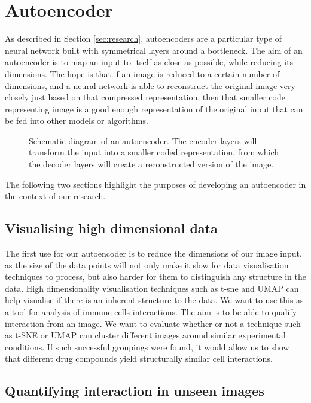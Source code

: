 \section{Autoencoder}

As described in Section \ref{sec:research}, autoencoders are a particular type of neural network built with symmetrical layers around a bottleneck. The aim of an autoencoder is to map an input to itself as close as possible, while reducing its dimensions. The hope is that if an image is reduced to a certain number of dimensions, and a neural network is able to reconstruct the original image very closely just based on that compressed representation, then that smaller code representing image is a good enough representation of the original input that can be fed into other models or algorithms.

\begin{figure}[h]
    \centering
    \caption{Schematic diagram of an autoencoder. The encoder layers will transform the input into a smaller coded representation, from which the decoder layers will create a reconstructed version of the image.}
    \label{fig:autoencoder}
\end{figure}

The following two sections highlight the purposes of developing an autoencoder in the context of our research.

\subsection{Visualising high dimensional data}

The first use for our autoencoder is to reduce the dimensions of our image input, as the size of the data points will not only make it slow for data visualisation techniques to process, but also harder for them to distinguish any structure in the data. High dimensionality visualisation techniques such as t-sne and UMAP can help visualise if there is an inherent structure to the data. We want to use this as a tool for analysis of immune cells interactions. The aim is to be able to qualify interaction from an image. We want to evaluate whether or not a technique such as t-SNE or UMAP can cluster different images around similar experimental conditions. If such successful groupings were found, it would allow us to show that different drug compounds yield structurally similar cell interactions.

\subsection{Quantifying interaction in unseen images}

